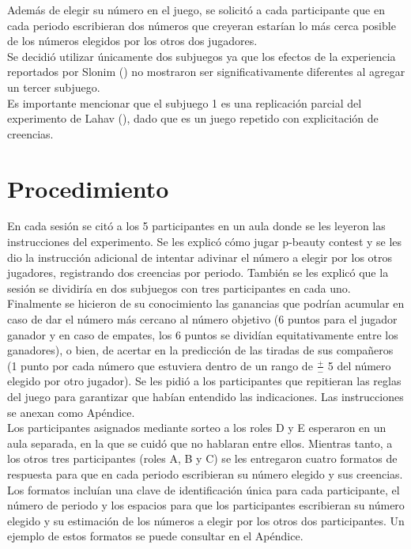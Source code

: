 Además de elegir su número en el juego, se solicitó a cada participante que en cada periodo escribieran dos números que creyeran estarían lo más cerca posible de los números elegidos por los otros dos jugadores.\\

Se decidió utilizar únicamente dos subjuegos ya que los efectos de la experiencia reportados por Slonim (\citeyear{Slonim}) no mostraron ser significativamente diferentes al agregar un tercer subjuego.\\

Es importante mencionar que el subjuego 1 es una replicación parcial del experimento de Lahav (\citeyear{Lahav}), dado que es un juego repetido con explicitación de creencias.\\

\section{Procedimiento}

En cada sesión se citó a los 5 participantes en un aula donde se les leyeron las instrucciones del experimento. Se les explicó cómo jugar p-beauty contest y se les dio la instrucción adicional de intentar adivinar el número a elegir por los otros jugadores, registrando dos creencias por periodo. También se les explicó que la sesión se dividiría en dos subjuegos con tres participantes en cada uno. Finalmente se hicieron de su conocimiento las ganancias que podrían acumular en caso de dar el número más cercano al número objetivo (6 puntos para el jugador ganador y en caso de empates, los 6 puntos se dividían equitativamente entre los ganadores), o bien, de acertar en la predicción de las tiradas de sus compañeros (1 punto por cada número que estuviera dentro de un rango de $\frac{+}{-}$ 5 del número elegido por otro jugador). Se les pidió a los participantes que repitieran las reglas del juego para garantizar que habían entendido las indicaciones. Las instrucciones se anexan como Apéndice.\\

Los participantes asignados mediante sorteo a los roles D y E esperaron en un aula separada, en la que se cuidó que no hablaran entre ellos. Mientras tanto, a los otros tres participantes (roles A, B y C) se les entregaron cuatro formatos de respuesta para que en cada periodo escribieran su número elegido y sus creencias. Los formatos incluían una clave de identificación única para cada participante, el número de periodo y los espacios para que los participantes escribieran su número elegido y su estimación de los números a elegir por los otros dos participantes. Un ejemplo de estos formatos se puede consultar en el Apéndice.\\


